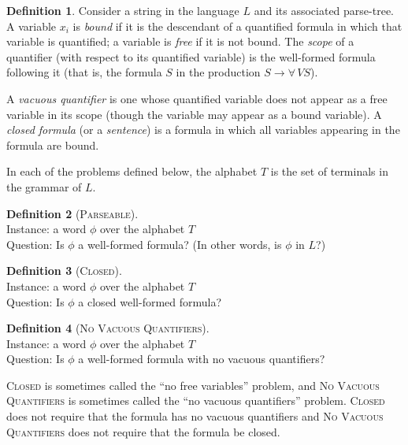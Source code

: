 \documentclass{article}
\theoremstyle{definition}
\newtheorem{definition}{Definition}
\newcommand{\yields}{\rightarrow}
\newcommand{\CLOSED}{\textsc{Closed}}
\newcommand{\PARSEABLE}{\textsc{Parseable}}
\newcommand{\NVQ}{\textsc{No Vacuous Quantifiers}}
\newenvironment{langdef}[1]{\begin{definition}[#1]\mbox{}}{\end{definition}}
\newenvironment{instance}{\\Instance:}{}
\newenvironment{question}{\\Question:}{}
\begin{document}
\begin{definition}
  Consider a string in the language $L$ and its associated parse-tree.
  A variable $x_i$ is \emph{bound} if it is the descendant of a quantified formula in which that variable is quantified; a variable is \emph{free} if it is not bound.
  The \emph{scope} of a quantifier (with respect to its quantified variable) is the well-formed formula following it (that is, the formula $S$ in the production $S \yields \forall \, V S$).

  A \emph{vacuous quantifier} is one whose quantified variable does not appear as a free variable in its scope (though the variable may appear as a bound variable).
  A \emph{closed formula} (or a \emph{sentence}) is a formula in which all variables appearing in the formula are bound.
\end{definition}

In each of the problems defined below, the alphabet $T$ is the set of terminals in the grammar of $L$.
\begin{langdef}{\PARSEABLE}
  \begin{instance}
    a word $\phi$ over the alphabet $T$
  \end{instance}
  \begin{question}
    Is $\phi$ a well-formed formula?
    (In other words, is $\phi$ in $L$?)
  \end{question}
\end{langdef}

\begin{langdef}{\CLOSED}
  \begin{instance}
    a word $\phi$ over the alphabet $T$
  \end{instance}
  \begin{question}
    Is $\phi$ a closed well-formed formula?
  \end{question}
\end{langdef}

\begin{langdef}{\NVQ}
  \begin{instance}
    a word $\phi$ over the alphabet $T$
  \end{instance}
  \begin{question}
    Is $\phi$ a well-formed formula with no vacuous quantifiers?
  \end{question}
\end{langdef}

\CLOSED{} is sometimes called the ``no free variables'' problem, and \NVQ{} is sometimes called the ``no vacuous quantifiers'' problem.
\CLOSED{} does not require that the formula has no vacuous quantifiers and \NVQ{} does not require that the formula be closed.
\end{document}
